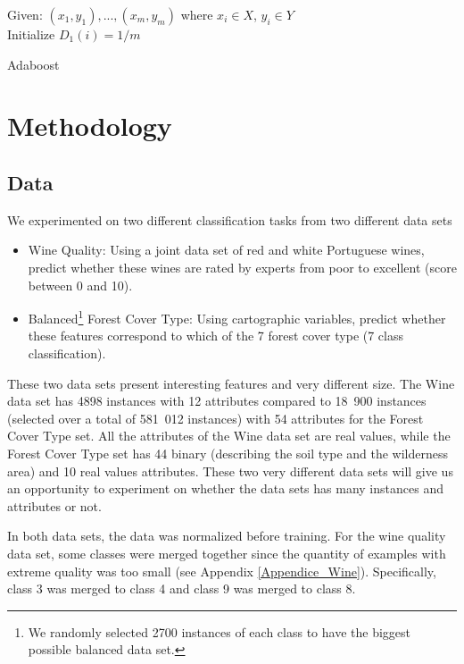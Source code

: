 \documentclass{article}
\begin{document}
\begin{algorithm}[H]
\SetAlgoLined
 Given: $(x_1,y_1),...,(x_m,y_m)$ where $x_i \in X$, $y_i \in Y$\\
 Initialize $D_1(i)=1/m$\;
 \caption{Adaboost}
\end{algorithm}

\section{Methodology}

\subsection{Data} 
We experimented on two different classification tasks from two different data sets

\begin{itemize}
    \item Wine Quality: Using a joint data set of red and white Portuguese wines, predict whether these wines are rated by experts from poor to excellent (score between 0 and 10).
    \item Balanced\footnote{We randomly selected 2700 instances of each class to have the biggest possible balanced data set.} Forest Cover Type: Using cartographic variables, predict whether these features correspond to which of the 7 forest cover type (7 class classification).  
\end{itemize}

These two data sets present interesting features and very different size. The Wine data set has 4898 instances with 12 attributes compared to 18\ 900 instances (selected over a total of 581\ 012 instances) with 54 attributes for the Forest Cover Type set. All the attributes of the Wine data set are real values, while the Forest Cover Type set has 44 binary (describing the soil type and the wilderness area) and 10 real values attributes. These two very different data sets will give us an opportunity to experiment on whether the data sets has many instances and attributes or not.

In both data sets, the data was normalized before training. For the wine quality data set, some classes were merged together since the quantity of examples with extreme quality was too small (see Appendix \ref{Appendice_Wine}). Specifically, class 3 was merged to class 4 and class 9 was merged to class 8.
\end{document}
